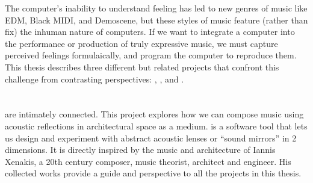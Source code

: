 The computer's inability to understand feeling has led to new genres
of music like EDM, Black
MIDI, and Demoscene, but these styles of music
feature (rather than fix) the inhuman nature of computers. If we want
to integrate a computer into the performance or production of truly
expressive music, we must capture perceived feelings formulaically,
and program the computer to reproduce them. This thesis describes
three different but related projects that confront this challenge from
contrasting perspectives: , \polytempic, and \thesis.

\section{}
\label{sec:refmod-intro}
 are intimately connected. This project
explores how we can compose music using acoustic reflections in
architectural space as a medium.  is a software tool that lets
us design and experiment with abstract acoustic lenses or ``sound
mirrors'' in 2 dimensions. It is directly inspired by the music and
architecture of Iannis Xenakis, a 20th century composer, music
theorist, architect and engineer. His collected works provide a guide
and perspective to all the projects in this thesis.

\section{\polytempic}
\label{sec:polytempic-intro}

